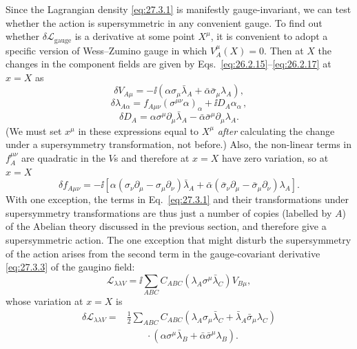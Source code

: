 Since the Lagrangian density \eqref{eq:27.3.1} is manifestly
gauge-invariant, we can test whether the action is supersymmetric in any
convenient gauge. To find out whether
\(\delta\mathcal{L}_{\mathrm{gauge}}\) is a derivative at some point
\(X^\mu\), it is convenient to adopt a specific version of Wess--Zumino
gauge in which \(V_A^\mu(X)=0\). Then at \(X\) the changes in the component
fields are given by Eqs.~\eqref{eq:26.2.15}--\eqref{eq:26.2.17} at \(x=X\)
as
\begin{equation}
  \delta V_{A\mu}
  =-\ii\left(
    \alpha\sigma_\mu\bar\lambda_A
    +
    \bar\alpha\bar\sigma_\mu\lambda_A\right),
  \tag{27.3.4}\label{eq:27.3.4}
\end{equation}
\begin{equation}
  \delta\lambda_{A\alpha}
  =f_{A\mu\nu}(\sigma^{\mu\nu}\alpha)_\alpha
    +\ii D_A\alpha_\alpha\,,
  \tag{27.3.5}\label{eq:27.3.5}
\end{equation}
\begin{equation}
  \delta D_A
  =\alpha\sigma^\mu\partial_\mu\bar\lambda_A
   -\bar\alpha\bar\sigma^\mu\partial_\mu\lambda_A.
  \tag{27.3.6}\label{eq:27.3.6}
\end{equation}
(We must set \(x^\mu\) in these expressions equal to \(X^\mu\)
\textit{after} calculating the change under a supersymmetry transformation,
not before.) Also, the non-linear terms in \(f_A^{\mu\nu}\) are quadratic
in the \(V\)s and therefore at \(x=X\) have zero variation, so at \(x=X\)
\begin{equation}
  \delta f_{A\mu\nu}
  =-\ii\left[
    \alpha(\sigma_\nu\partial_\mu-\sigma_\mu\partial_\nu)\bar\lambda_A
    +\bar\alpha(\bar\sigma_\nu\partial_\mu
      -\bar\sigma_\mu\partial_\nu)\lambda_A
  \right].
  \tag{27.3.7}\label{eq:27.3.7}
\end{equation}
With one exception, the terms in Eq.~\eqref{eq:27.3.1} and their
transformations under supersymmetry transformations are thus just a number
of copies (labelled by \(A\)) of the Abelian theory discussed in the
previous section, and therefore give a supersymmetric action. The one
exception that might disturb the supersymmetry of the action arises from
the second term in the gauge-covariant derivative \eqref{eq:27.3.3} of the
gaugino field:
\begin{equation}
  \mathcal{L}_{\lambda\lambda V}
  =\ii\sum_{ABC}C_{ABC}
    \left(\lambda_A\sigma^\mu\bar\lambda_C\right)V_{B\mu},
  \tag{27.3.8}\label{eq:27.3.8}
\end{equation}
whose variation at \(x=X\) is
\begin{equation}
  \begin{aligned}
  \delta\mathcal{L}_{\lambda\lambda V}
  ={}&\frac12\sum_{ABC}C_{ABC}
    \left(\lambda_A\sigma_\mu\bar\lambda_C
      +\bar\lambda_A\bar\sigma_\mu\lambda_C\right)
  \\
  &\qquad{}\cdot
    \left(\alpha\sigma^\mu\bar\lambda_B
      +\bar\alpha\bar\sigma^\mu\lambda_B\right).
  \end{aligned}
  \tag{27.3.9}\label{eq:27.3.9}
\end{equation}
